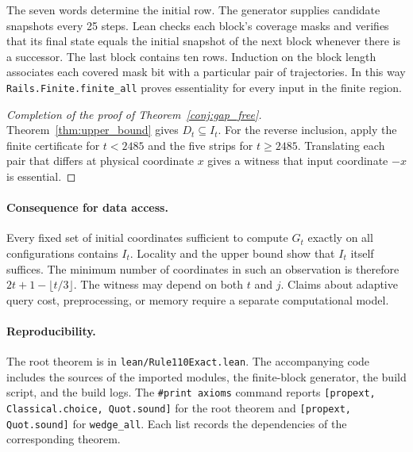 \documentclass[11pt, a4paper]{article}
\begin{document}
The seven words determine the initial row. The generator supplies candidate snapshots every 25 steps. Lean checks each block's coverage masks and verifies that its final state equals the initial snapshot of the next block whenever there is a successor. The last block contains ten rows. Induction on the block length associates each covered mask bit with a particular pair of trajectories. In this way \texttt{Rails.Finite.finite\_all} proves essentiality for every input in the finite region.

\begin{proof}[Completion of the proof of Theorem~\ref{conj:gap_free}]
Theorem~\ref{thm:upper_bound} gives $D_t\subseteq I_t$. For the reverse inclusion, apply the finite certificate for $t<2485$ and the five strips for $t\ge2485$. Translating each pair that differs at physical coordinate $x$ gives a witness that input coordinate $-x$ is essential.
\end{proof}

\paragraph{Consequence for data access.}
Every fixed set of initial coordinates sufficient to compute $G_t$ exactly on all configurations contains $I_t$. Locality and the upper bound show that $I_t$ itself suffices. The minimum number of coordinates in such an observation is therefore $2t+1-\lfloor t/3\rfloor$. The witness may depend on both $t$ and $j$. Claims about adaptive query cost, preprocessing, or memory require a separate computational model.

\paragraph{Reproducibility.}
The root theorem is in \texttt{lean/Rule110Exact.lean}. The accompanying code includes the sources of the imported modules, the finite-block generator, the build script, and the build logs. The \texttt{\#print axioms} command reports \texttt{[propext, Classical.choice, Quot.sound]} for the root theorem and \texttt{[propext, Quot.sound]} for \texttt{wedge\_all}. Each list records the dependencies of the corresponding theorem.
\end{document}
